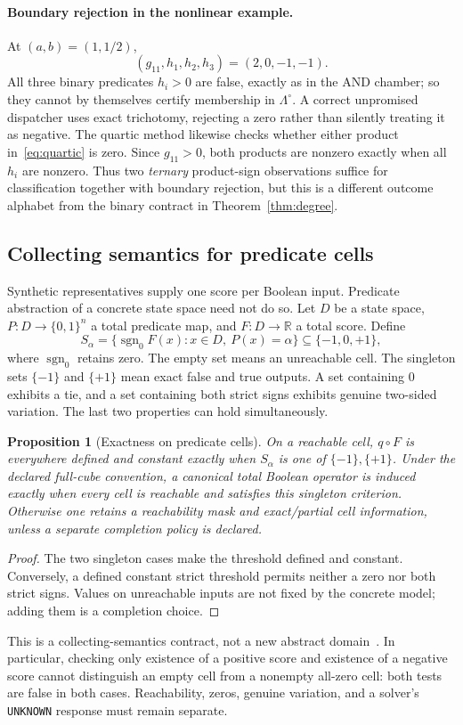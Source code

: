 \documentclass[11pt]{article}
\newtheorem{proposition}[theorem]{Proposition}
\theoremstyle{definition}
\theoremstyle{remark}
\newcommand{\R}{\mathbb R}
\newcommand{\B}{\{0,1\}}
\newcommand{\sgnzero}{\operatorname{sgn}_0}
\begin{document}
\paragraph{Boundary rejection in the nonlinear example.}
At $(a,b)=(1,1/2)$,
\[
 (g_{11},h_1,h_2,h_3)=(2,0,-1,-1).
\]
All three binary predicates $h_i>0$ are false, exactly as in the AND chamber; so they cannot by themselves certify membership in $\Lambda^\circ$. A correct unpromised dispatcher uses exact trichotomy, rejecting a zero rather than silently treating it as negative. The quartic method likewise checks whether either product in~\eqref{eq:quartic} is zero. Since $g_{11}>0$, both products are nonzero exactly when all $h_i$ are nonzero. Thus two \emph{ternary} product-sign observations suffice for classification together with boundary rejection, but this is a different outcome alphabet from the binary contract in Theorem~\ref{thm:degree}.

\subsection{Collecting semantics for predicate cells}
Synthetic representatives supply one score per Boolean input. Predicate abstraction of a concrete state space need not do so. Let $D$ be a state space, $P:D\to\B^n$ a total predicate map, and $F:D\to\R$ a total score. Define
\[
 S_\alpha=\{\sgnzero F(x):x\in D,\ P(x)=\alpha\}\subseteq\{-1,0,+1\},
\]
where $\sgnzero$ retains zero. The empty set means an unreachable cell. The singleton sets $\{-1\}$ and $\{+1\}$ mean exact false and true outputs. A set containing $0$ exhibits a tie, and a set containing both strict signs exhibits genuine two-sided variation. The last two properties can hold simultaneously.

\begin{proposition}[Exactness on predicate cells]\label{prop:collecting}
On a reachable cell, $q\circ F$ is everywhere defined and constant exactly when $S_\alpha$ is one of $\{-1\},\{+1\}$. Under the declared full-cube convention, a canonical total Boolean operator is induced exactly when every cell is reachable and satisfies this singleton criterion. Otherwise one retains a reachability mask and exact/partial cell information, unless a separate completion policy is declared.
\end{proposition}
\begin{proof}
The two singleton cases make the threshold defined and constant. Conversely, a defined constant strict threshold permits neither a zero nor both strict signs. Values on unreachable inputs are not fixed by the concrete model; adding them is a completion choice.
\end{proof}
This is a collecting-semantics contract, not a new abstract domain~\cite{Cousot1977}. In particular, checking only existence of a positive score and existence of a negative score cannot distinguish an empty cell from a nonempty all-zero cell: both tests are false in both cases. Reachability, zeros, genuine variation, and a solver's \texttt{UNKNOWN} response must remain separate.
\end{document}
